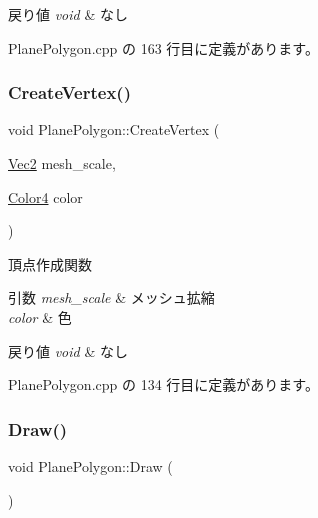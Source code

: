 \begin{DoxyRetVals}{戻り値}
{\em void} & なし \\
\hline
\end{DoxyRetVals}


 Plane\+Polygon.\+cpp の 163 行目に定義があります。

\mbox{\label{class_plane_polygon_a4636b29e9f115e00b16a52089508fb2e}} 
\subsubsection{\texorpdfstring{Create\+Vertex()}{CreateVertex()}}
{\footnotesize\ttfamily void Plane\+Polygon\+::\+Create\+Vertex (\begin{DoxyParamCaption}\item[{\mbox{\hyperlink{_vector3_d_8h_a5ef6e95dfc5f9d3820b71772d99bbc25}{Vec2}}}]{mesh\+\_\+scale,  }\item[{\mbox{\hyperlink{_vector3_d_8h_a9c2339f516cf07ce4753b8a99fab3791}{Color4}}}]{color }\end{DoxyParamCaption})\hspace{0.3cm}{\ttfamily [private]}}



頂点作成関数 


\begin{DoxyParams}{引数}
{\em mesh\+\_\+scale} & メッシュ拡縮 \\
\hline
{\em color} & 色 \\
\hline
\end{DoxyParams}

\begin{DoxyRetVals}{戻り値}
{\em void} & なし \\
\hline
\end{DoxyRetVals}


 Plane\+Polygon.\+cpp の 134 行目に定義があります。

\mbox{\label{class_plane_polygon_a2f20691ee0feee4fa428f5d017d7062a}} 
\subsubsection{\texorpdfstring{Draw()}{Draw()}}
{\footnotesize\ttfamily void Plane\+Polygon\+::\+Draw (\begin{DoxyParamCaption}{ }\end{DoxyParamCaption})}



